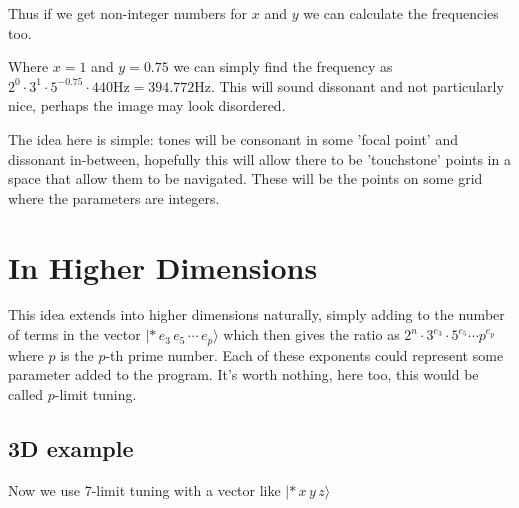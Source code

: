 \documentclass[10pt,a4paper]{article}
\begin{document}
Thus if we get non-integer numbers for $x$ and $y$ we can calculate the frequencies too.
\begin{center}
\end{center}

Where $x=1$ and $y=0.75$ we can simply find the frequency as $2^0 \cdot 3^1 \cdot 5^{-0.75} \cdot
440\si{\hertz} = 394.772\si{\hertz}$. This will sound dissonant and not particularly nice, perhaps
the image may look disordered.

The idea here is simple: tones will be consonant in some 'focal point' and dissonant in-between,
hopefully this will allow there to be 'touchstone' points in a space that allow them to be
navigated. These will be the points on some grid where the parameters are integers.

\section{In Higher Dimensions}
This idea extends into higher dimensions naturally, simply adding to the number of terms in the
vector $|*\, e_3\, e_5\, \cdots\, e_p \rangle$ which then gives the ratio as $2^n \cdot 3^{e_3}
\cdot 5^{e_5} \cdots p^{e_p}$ where $p$ is the $p$-th prime number. Each of these exponents could
represent some parameter added to the program. It's worth nothing, here too, this would be called
$p$-limit tuning.

\subsection{3D example}
Now we use 7-limit tuning with a vector like $| *\, x\, y\, z\rangle$

\begin{center}
\end{center}
\end{document}
